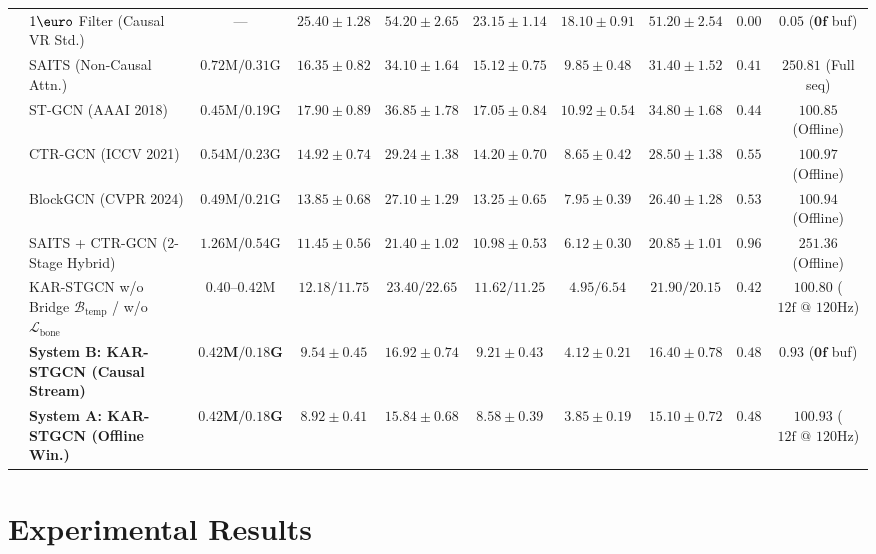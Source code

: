\documentclass[10pt,twocolumn]{article}
\begin{document}
\begin{table}[!t]
{\begin{tabular}{llcccccccc}
& $1\text{\euro}$ Filter \cite{casiez20121euro} (Causal VR Std.) & --- & $25.40 \pm 1.28$ & $54.20 \pm 2.65$ & $23.15 \pm 1.14$ & $18.10 \pm 0.91$ & $51.20 \pm 2.54$ & $0.00$ & $\mathbf{0.05}$ ($\mathbf{0\text{f}}$ buf) \\
& SAITS \cite{du2023saits} (Non-Causal Attn.) & $0.72\text{M} / 0.31\text{G}$ & $16.35 \pm 0.82$ & $34.10 \pm 1.64$ & $15.12 \pm 0.75$ & $9.85 \pm 0.48$ & $31.40 \pm 1.52$ & $0.41$ & $250.81$ (Full seq) \\
& ST-GCN \cite{yan2018spatial} (AAAI 2018) & $0.45\text{M} / 0.19\text{G}$ & $17.90 \pm 0.89$ & $36.85 \pm 1.78$ & $17.05 \pm 0.84$ & $10.92 \pm 0.54$ & $34.80 \pm 1.68$ & $0.44$ & $100.85$ (Offline) \\
& CTR-GCN \cite{chen2021channel} (ICCV 2021) & $0.54\text{M} / 0.23\text{G}$ & $14.92 \pm 0.74$ & $29.24 \pm 1.38$ & $14.20 \pm 0.70$ & $8.65 \pm 0.42$ & $28.50 \pm 1.38$ & $0.55$ & $100.97$ (Offline) \\
& BlockGCN \cite{zhou2024blockgcn} (CVPR 2024) & $0.49\text{M} / 0.21\text{G}$ & $13.85 \pm 0.68$ & $27.10 \pm 1.29$ & $13.25 \pm 0.65$ & $7.95 \pm 0.39$ & $26.40 \pm 1.28$ & $0.53$ & $100.94$ (Offline) \\
& SAITS + CTR-GCN (2-Stage Hybrid) & $1.26\text{M} / 0.54\text{G}$ & $11.45 \pm 0.56$ & $21.40 \pm 1.02$ & $10.98 \pm 0.53$ & $6.12 \pm 0.30$ & $20.85 \pm 1.01$ & $0.96$ & $251.36$ (Offline) \\
& KAR-STGCN w/o Bridge $\mathcal{B}_{\text{temp}}$ / w/o $\mathcal{L}_{\text{bone}}$ & $0.40\text{--}0.42\text{M}$ & $12.18 / 11.75$ & $23.40 / 22.65$ & $11.62 / 11.25$ & $4.95 / 6.54$ & $21.90 / 20.15$ & $0.42$ & $100.80$ ($12\text{f @ 120Hz}$) \\
& \textbf{System B: KAR-STGCN (Causal Stream)} & $\mathbf{0.42\text{M} / 0.18\text{G}}$ & $9.54 \pm 0.45$ & $16.92 \pm 0.74$ & $9.21 \pm 0.43$ & $4.12 \pm 0.21$ & $16.40 \pm 0.78$ & $0.48$ & $\mathbf{0.93}$ ($\mathbf{0\text{f}}$ buf) \\
& \textbf{System A: KAR-STGCN (Offline Win.)} & $\mathbf{0.42\text{M} / 0.18\text{G}}$ & $\mathbf{8.92 \pm 0.41}$ & $\mathbf{15.84 \pm 0.68}$ & $\mathbf{8.58 \pm 0.39}$ & $\mathbf{3.85 \pm 0.19}$ & $\mathbf{15.10 \pm 0.72}$ & $0.48$ & $100.93$ ($12\text{f @ 120Hz}$) \\
\bottomrule
\end{tabular}
}
\end{table}

\section{Experimental Results}
\end{document}

